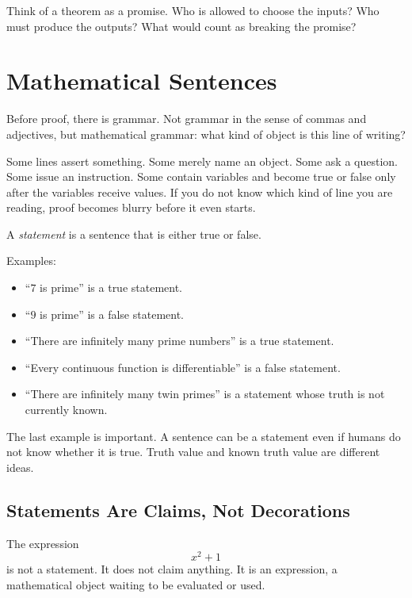 \begin{walkbox}
Think of a theorem as a promise. Who is allowed to choose the inputs? Who must produce the outputs? What would count as breaking the promise?
\end{walkbox}

\section{Mathematical Sentences}

Before proof, there is grammar. Not grammar in the sense of commas and adjectives, but mathematical grammar: what kind of object is this line of writing?

Some lines assert something. Some merely name an object. Some ask a question. Some issue an instruction. Some contain variables and become true or false only after the variables receive values. If you do not know which kind of line you are reading, proof becomes blurry before it even starts.

\begin{formalbox}
A \emph{statement} is a sentence that is either true or false.
\end{formalbox}

Examples:

\begin{itemize}
\item ``$7$ is prime'' is a true statement.
\item ``$9$ is prime'' is a false statement.
\item ``There are infinitely many prime numbers'' is a true statement.
\item ``Every continuous function is differentiable'' is a false statement.
\item ``There are infinitely many twin primes'' is a statement whose truth is not currently known.
\end{itemize}

The last example is important. A sentence can be a statement even if humans do not know whether it is true. Truth value and known truth value are different ideas.

\subsection{Statements Are Claims, Not Decorations}

The expression
\[
x^2+1
\]
is not a statement. It does not claim anything. It is an expression, a mathematical object waiting to be evaluated or used.

